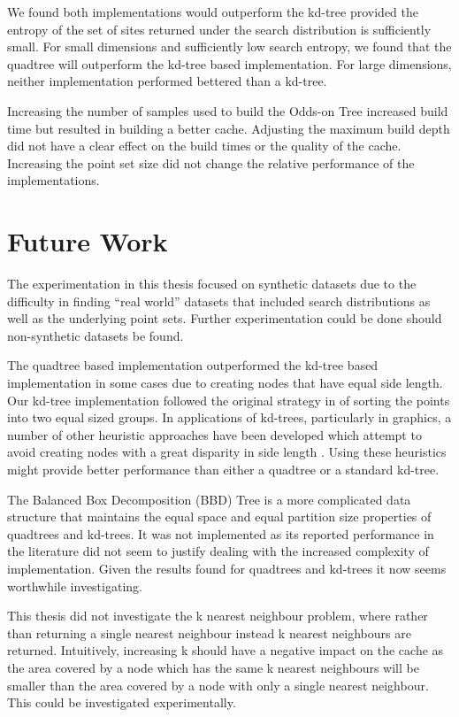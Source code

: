 \documentclass[mcs]{scsthesis}
\begin{document}
We found both implementations would outperform the kd-tree provided the entropy
of the set of sites returned under the search distribution is sufficiently
small. For small dimensions and sufficiently low search entropy, we found that
the quadtree will outperform the kd-tree based implementation. For large
dimensions, neither implementation performed bettered than a kd-tree.

Increasing the number of samples used to build the Odds-on Tree increased
build time but resulted in building a better cache. Adjusting the maximum
build depth did not have a clear effect on the build times or the quality of the
cache. Increasing the point set size did not change the relative performance
of the implementations.

\section{Future Work}

The experimentation in this thesis focused on synthetic datasets due to the
difficulty in finding ``real world'' datasets that included search distributions
as well as the underlying point sets. Further experimentation could be done
should non-synthetic datasets be found.

The quadtree based implementation outperformed the kd-tree based implementation
in some cases due to creating nodes that have equal side length. Our kd-tree
implementation followed the original strategy in \cite{kdtree} of sorting the
points into two equal sized groups. In applications of kd-trees, particularly
in graphics, a number of other heuristic approaches have been developed which
attempt to avoid creating nodes with a great disparity in side length
\cite{physicallybasedrendering}. Using these heuristics might provide better
performance than either a quadtree or a standard kd-tree.

The Balanced Box Decomposition (BBD) Tree \cite{optimalann} is a more
complicated data structure that maintains the equal space and equal partition
size properties of quadtrees and kd-trees. It was not implemented as its
reported performance in the literature did not seem to justify dealing with the
increased complexity of implementation. Given the results found for quadtrees
and kd-trees it now seems worthwhile investigating.

This thesis did not investigate the k nearest neighbour problem, where rather
than returning a single nearest neighbour instead k nearest neighbours are
returned. Intuitively, increasing k should have a negative impact on the cache
as the area covered by a node which has the same k nearest neighbours will be
smaller than the area covered by a node with only a single nearest neighbour.
This could be investigated experimentally.
\end{document}
